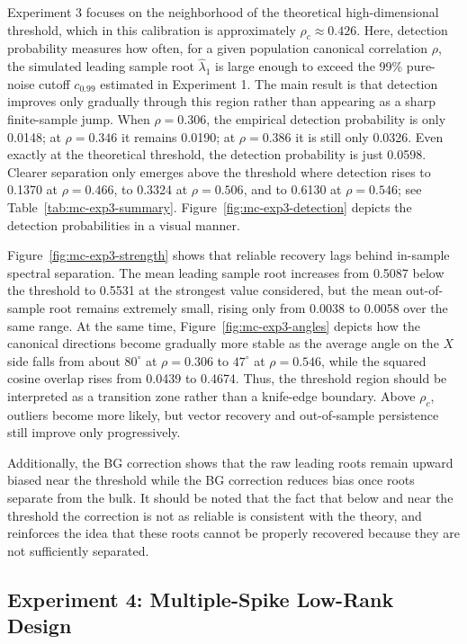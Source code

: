\documentclass[12pt]{report} %
\begin{document}
Experiment 3 focuses on the neighborhood of the theoretical high-dimensional threshold, which in this 
calibration is approximately $\rho_c \approx 0.426$. Here, detection probability measures how often, 
for a given population canonical correlation \(\rho\), the simulated leading sample root 
\(\widehat{\lambda}_1\) is large enough to exceed the 99\% pure-noise cutoff \(c_{0.99}\) estimated 
in Experiment 1. The main result is that detection improves only 
gradually through this region rather than appearing as a sharp finite-sample jump. When $\rho=0.306$, 
the empirical detection probability is only 0.0148; at $\rho=0.346$ it remains 0.0190; at $\rho=0.386$ 
it is still only 0.0326. Even exactly at the theoretical threshold, the detection probability is just 0.0598. 
Clearer separation only emerges above the threshold where detection rises to 0.1370 at $\rho=0.466$, 
to 0.3324 at $\rho=0.506$, and to 0.6130 at $\rho=0.546$; see Table~\ref{tab:mc-exp3-summary}. 
Figure~\ref{fig:mc-exp3-detection} depicts the detection probabilities in a visual manner.

Figure~\ref{fig:mc-exp3-strength} shows that reliable recovery lags behind in-sample spectral separation. The mean 
leading sample root increases from 0.5087 below the threshold to 0.5531 at the strongest value considered, 
but the mean out-of-sample root remains extremely small, rising only from 0.0038 to 0.0058 over the same range. 
At the same time, Figure~\ref{fig:mc-exp3-angles} depicts how the canonical directions become gradually 
more stable as the average angle on the $X$ side falls from about $80^\circ$ at $\rho=0.306$ to 
$47^\circ$ at $\rho=0.546$, while the squared cosine overlap rises from 0.0439 to 0.4674. Thus, the 
threshold region should be interpreted as a transition zone rather than a knife-edge boundary. 
Above $\rho_c$, outliers become more likely, but vector recovery and out-of-sample persistence still 
improve only progressively.

Additionally, the BG correction shows that the raw leading roots remain upward biased 
near the threshold while the BG correction reduces bias once roots separate from the bulk. 
It should be noted that the fact that below and near the threshold the correction
is not as reliable is consistent with the theory, and reinforces the idea
that these roots cannot be properly recovered because they are not sufficiently separated.

\subsection*{Experiment 4: Multiple-Spike Low-Rank Design}
\end{document}
